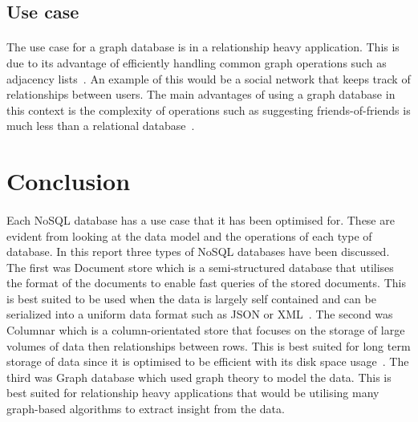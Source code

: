 \documentclass{CRPITStyle}
\renewcommand{\cite}{\citep}
\begin{document}
\subsection{Use case}

\paragraph{}
The use case for a graph database is in a relationship
heavy application.
This is due to its advantage of efficiently handling
common graph operations such as adjacency lists~\cite{neo4j,nosql_survey}.
An example of this would be a social network that keeps track
of relationships between users.
The main advantages of using a graph database in this context is
the complexity of operations such as suggesting friends-of-friends is
much less than a relational database~\cite{nosql_performance,neo4j}.


\section{Conclusion}


\paragraph{}
Each NoSQL database has a use case that it has been optimised for.
These are evident from looking at the data model and the operations of
each type of database.
In this report three types of NoSQL databases have been discussed.
The first was Document store which is a semi-structured database that
utilises the format of the documents to enable fast queries of the stored
documents.
This is best suited to be used when the data is largely self contained and can
be serialized into a uniform data format such as JSON or
XML~\cite{type_nosql,basex}.
The second was Columnar which is a column-orientated store that focuses
on the storage of large volumes of data then relationships between
rows.
This is best suited for long term storage of data since it is optimised to
be efficient with its disk space usage~\cite{bigtable}.
The third was Graph database which used graph theory to model the data.
This is best suited for relationship heavy applications that would
be utilising many graph-based algorithms to extract insight from the data.




\end{document}
